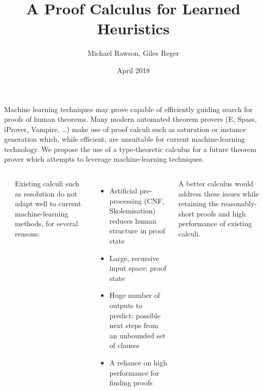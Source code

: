 \documentclass[24pt, a1paper, portrait]{tikzposter}
\title{A Proof Calculus for Learned Heuristics}
\author{Michael Rawson, Giles Reger}
\date{April 2018}
\institute{University of Manchester, UK}
\begin{document}
\maketitle

{
	Machine learning techniques may prove capable of efficiently guiding search for proofs of human theorems.
	Many modern automated theorem provers (E, {\sc Spass}, iProver, Vampire, \ldots) make use of proof calculi such as saturation or instance generation which, while efficient, are unsuitable for current machine-learning technology.
	We propose the use of a type-theoretic calculus for a future theorem prover which attempts to leverage machine-learning techniques.
}

\begin{columns}
{
	\begin{tikzfigure}
	\end{tikzfigure}
}

{
	Existing calculi such as resolution do not adapt well to current machine-learning methods, for several reasons:

	\begin{itemize}[leftmargin=1.5cm]
		\item Artificial pre-processing (CNF, Skolemisation) reduces human structure in proof state
		\item Large, recursive input space: proof state
		\item Huge number of outputs to predict: possible next steps from an unbounded set of clauses
		\item A reliance on high performance for finding proofs
	\end{itemize}
	A better calculus would address these issues while retaining the reasonably-short proofs and high performance of existing calculi.
}


\end{columns}
\end{document}

